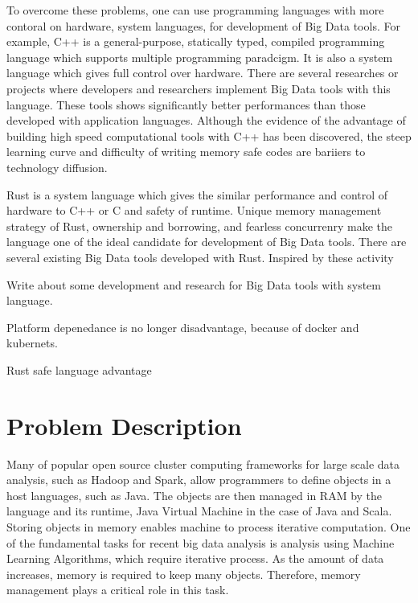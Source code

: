 To overcome these problems, one can use programming languages with more contoral on hardware, system languages, for development of Big Data tools. For example, C++ is a general-purpose, statically typed, 
compiled programming language which supports multiple programming paradcigm. It is also a system language which gives full control over hardware. There are several researches or projects where developers and 
researchers implement Big Data tools with this language. These tools shows significantly better performances than those developed with application languages. 
Although the evidence of the advantage of building high speed computational tools with C++ has been discovered, the steep learning curve and difficulty of writing memory safe codes are bariiers to technology diffusion.

Rust is a system language which gives the similar performance and control of hardware to C++ or C and safety of runtime. Unique memory management strategy of Rust, ownership and borrowing, and fearless concurrenry 
make the language one of the ideal candidate for development of Big Data tools. There are several existing Big Data tools developed with Rust. Inspired by these activity

Write about some development and research for Big Data tools with system language. 

Platform depenedance is no longer disadvantage, because of docker and kubernets.

Rust safe language advantage






\section{Problem Description}
\label{sec:history}

Many of popular open source cluster computing frameworks for large scale data analysis, 
such as Hadoop and Spark, allow programmers to define objects in a host languages, such as Java.
The objects are then managed in RAM by the language and its runtime, Java Virtual Machine 
in the case of Java and Scala. Storing objects in memory enables machine to process iterative computation. 
One of the fundamental tasks for recent big data analysis is analysis using Machine Learning Algorithms, 
which require iterative process. As the amount of data increases, memory is required to keep many objects. 
Therefore, memory management plays a critical role in this task. 

